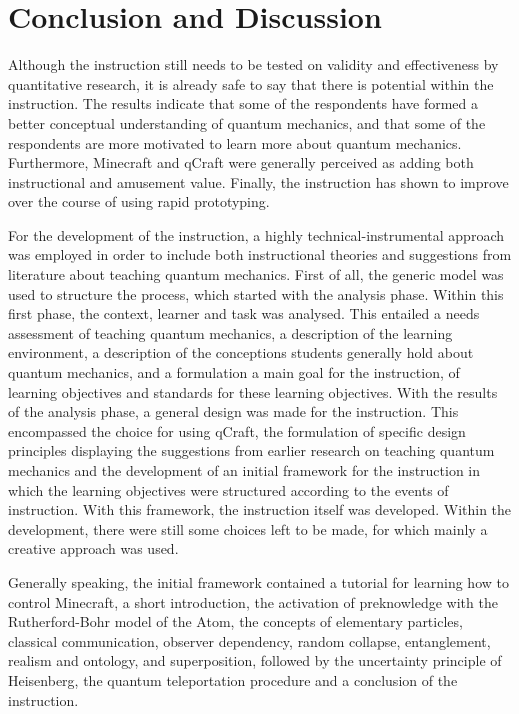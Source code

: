 \documentclass[11pt,twoside]{report} %
\begin{document}
\part{Conclusion and Discussion}

Although the instruction still needs to be tested on validity and effectiveness by quantitative research, it is already safe to say that there is potential within the instruction. The results indicate that some of the respondents have formed a better conceptual understanding of quantum mechanics, and that some of the respondents are more motivated to learn more about quantum mechanics. Furthermore, Minecraft and qCraft were generally perceived as adding both instructional and amusement value. Finally, the instruction has shown to improve over the course of using rapid prototyping.

For the development of the instruction, a highly technical-instrumental approach was employed in order to include both instructional theories and suggestions from literature about teaching quantum mechanics. First of all, the generic model was used to structure the process, which started with the analysis phase. Within this first phase, the context, learner and task was analysed. This entailed a needs assessment of teaching quantum mechanics, a description of the learning environment, a description of the conceptions students generally hold about quantum mechanics, and a formulation a main goal for the instruction, of learning objectives and standards for these learning objectives. With the results of the analysis phase, a general design was made for the instruction. This encompassed the choice for using qCraft, the formulation of specific design principles displaying the suggestions from earlier research on teaching quantum mechanics and the development of an initial framework for the instruction in which the learning objectives were structured according to the events of instruction. With this framework, the instruction itself was developed. Within the development, there were still some choices left to be made, for which mainly a creative approach was used.

Generally speaking, the initial framework contained a tutorial for learning how to control Minecraft, a short introduction, the activation of preknowledge with the Rutherford-Bohr model of the Atom, the concepts of elementary particles, classical communication, observer dependency, random collapse, entanglement, realism and ontology, and superposition, followed by the uncertainty principle of Heisenberg, the quantum teleportation procedure and a conclusion of the instruction.
\end{document}
